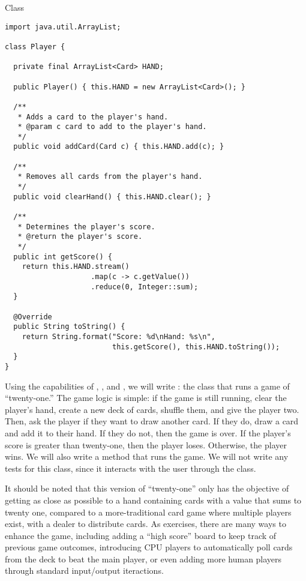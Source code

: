 \begin{cl}{ Class}
\begin{lstlisting}[language=MyJava]
import java.util.ArrayList;

class Player {

  private final ArrayList<Card> HAND;

  public Player() { this.HAND = new ArrayList<Card>(); }

  /**
   * Adds a card to the player's hand.
   * @param c card to add to the player's hand.
   */
  public void addCard(Card c) { this.HAND.add(c); }

  /**
   * Removes all cards from the player's hand.
   */
  public void clearHand() { this.HAND.clear(); }

  /**
   * Determines the player's score.
   * @return the player's score.
   */
  public int getScore() {
    return this.HAND.stream()
                    .map(c -> c.getValue())
                    .reduce(0, Integer::sum);
  }

  @Override
  public String toString() {
    return String.format("Score: %d\nHand: %s\n", 
                         this.getScore(), this.HAND.toString());
  }
}
\end{lstlisting}
\end{cl}

Using the capabilities of , , and , we will write : the class that runs a game of ``twenty-one.'' The game logic is simple: if the game is still running, clear the player's hand, create a new deck of cards, shuffle them, and give the player two. Then, ask the player if they want to draw another card. If they do, draw a card and add it to their hand. If they do not, then the game is over. If the player's score is greater than twenty-one, then the player loses. Otherwise, the player wins. We will also write a  method that runs the game. We will not write any tests for this class, since it interacts with the user through the  class.

It should be noted that this version of ``twenty-one'' only has the objective of getting as close as possible to a hand containing cards with a value that sums to twenty one, compared to a more-traditional card game where multiple players exist, with a dealer to distribute cards. As exercises, there are many ways to enhance the game, including adding a ``high score'' board to keep track of previous game outcomes, introducing CPU players to automatically poll cards from the deck to beat the main player, or even adding more human players through standard input/output iteractions. 

